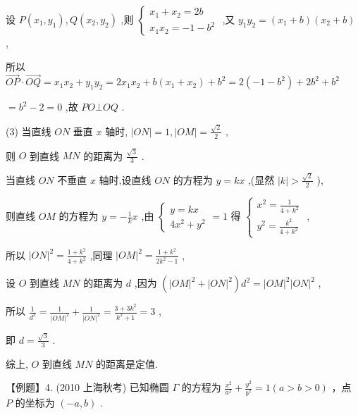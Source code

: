 \documentclass[10pt]{article}
\begin{document}
设 \(P\left( {{x}_{1},{y}_{1}}\right) ,Q\left( {{x}_{2},{y}_{2}}\right)\) ,则 \(\left\{  \begin{array}{l} {x}_{1} + {x}_{2} = {2b} \\  {x}_{1}{x}_{2} =  - 1 - {b}^{2} \end{array}\right.\) ,又 \({y}_{1}{y}_{2} = \left( {{x}_{1} + b}\right) \left( {{x}_{2} + b}\right)\) ,

所以 \(\overrightarrow{OP} \cdot  \overrightarrow{OQ} = {x}_{1}{x}_{2} + {y}_{1}{y}_{2} = 2{x}_{1}{x}_{2} + b\left( {{x}_{1} + {x}_{2}}\right)  + {b}^{2} = 2\left( {-1 - {b}^{2}}\right)  + 2{b}^{2} + {b}^{2}\)

\(= {b}^{2} - 2 = 0\) ,故 \({PO} \bot  {OQ}\) .

(3) 当直线 \({ON}\) 垂直 \(x\) 轴时, \(\left| {ON}\right|  = 1,\left| {OM}\right|  = \frac{\sqrt{2}}{2}\) ,

则 \(O\) 到直线 \({MN}\) 的距离为 \(\frac{\sqrt{3}}{3}\) .

当直线 \({ON}\) 不垂直 \(x\) 轴时,设直线 \({ON}\) 的方程为 \(y = {kx}\) ,(显然 \(\left| k\right|  > \frac{\sqrt{2}}{2}\) ),

则直线 \({OM}\) 的方程为 \(y =  - \frac{1}{k}x\) ,由 \(\left\{  {\begin{array}{l} y = {kx} \\  4{x}^{2} + {y}^{2} \end{array} = 1}\right.\) 得 \(\left\{  \begin{array}{l} {x}^{2} = \frac{1}{4 + {k}^{2}} \\  {y}^{2} = \frac{{k}^{2}}{4 + {k}^{2}} \end{array}\right.\) ,

所以 \({\left| ON\right| }^{2} = \frac{1 + {k}^{2}}{4 + {k}^{2}}\) ,同理 \({\left| OM\right| }^{2} = \frac{1 + {k}^{2}}{2{k}^{2} - 1}\) ,

设 \(O\) 到直线 \({MN}\) 的距离为 \(d\) ,因为 \(\left( {{\left| OM\right| }^{2} + {\left| ON\right| }^{2}}\right) {d}^{2} = {\left| OM\right| }^{2}{\left| ON\right| }^{2}\) ,

所以 \(\frac{1}{{d}^{2}} = \frac{1}{{\left| OM\right| }^{2}} + \frac{1}{{\left| ON\right| }^{2}} = \frac{3 + 3{k}^{2}}{{k}^{2} + 1} = 3\) ,

即 \(d = \frac{\sqrt{3}}{3}\) .

综上, \(O\) 到直线 \({MN}\) 的距离是定值.

【例题】4. (2010 上海秋考) 已知椭圆 \(\Gamma\) 的方程为 \(\frac{{x}^{2}}{{a}^{2}} + \frac{{y}^{2}}{{b}^{2}} = 1\left( {a > b > 0}\right)\) ，点 \(P\) 的坐标为 \(\left( {-a,b}\right)\) .
\end{document}
